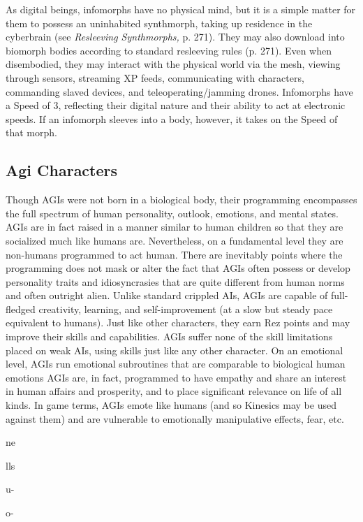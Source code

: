 As digital beings, infomorphs have no physical 
mind, but it is a simple matter for them to possess 
an uninhabited synthmorph, taking up residence in 
the cyberbrain (see \textit{Resleeving Synthmorphs,} p. 271). 
They may also download into biomorph bodies according
to standard resleeving rules (p. 271). Even
when disembodied, they may interact with the 
physical world via the mesh, viewing through sensors, 
streaming XP feeds, communicating with characters, 
commanding slaved devices, and teleoperating/jamming
drones.
Infomorphs have a Speed of 3, reflecting their digital
nature and their ability to act at electronic speeds.
If an infomorph sleeves into a body, however, it takes 
on the Speed of that morph.

\subsection{Agi Characters}

Though AGIs were not born in a biological body, their 
programming encompasses the full spectrum of human 
personality, outlook, emotions, and mental states. AGIs 
are in fact raised in a manner similar to human children
so that they are socialized much like humans are.
Nevertheless, on a fundamental level they are non-humans
programmed to act human. There are inevitably
points where the programming does not mask or alter 
the fact that AGIs often possess or develop personality 
traits and idiosyncrasies that are quite different from 
human norms and often outright alien.
Unlike standard crippled AIs, AGIs are capable of 
full-fledged creativity, learning, and self-improvement 
(at a slow but steady pace equivalent to humans). Just 
like other characters, they earn Rez points and may 
improve their skills and capabilities. AGIs suffer none 
of the skill limitations placed on weak AIs, using skills 
just like any other character.
On an emotional level, AGIs run emotional subroutines
that are comparable to biological human emotions
AGIs are, in fact, programmed to have empathy
and share an interest in human affairs and prosperity, 
and to place significant relevance on life of all kinds. 
In game terms, AGIs emote like humans (and so Kinesics
may be used against them) and are vulnerable to
emotionally manipulative effects, fear, etc.

ne 

lls 

u-

o-
